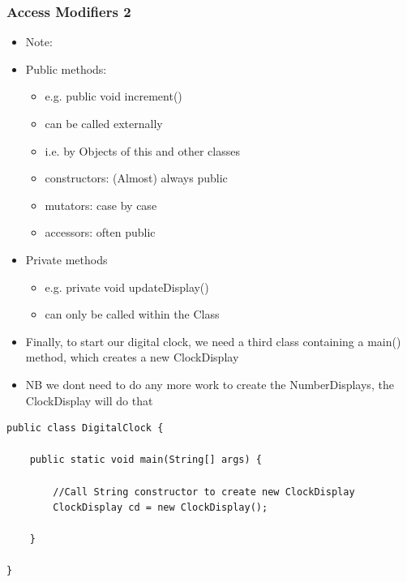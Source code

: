 \documentclass{beamer}
\begin{document}
\begin{frame}
\frametitle{Access Modifiers 2}
\begin{itemize}
\item Note: 

\item Public methods:

\begin{itemize}
\item e.g. public void increment() 
\item can be called externally
\item i.e. by Objects of this and other classes
\bigskip
\item constructors: (Almost) always public
\item mutators: case by case
\item accessors: often public
\end{itemize}
\item Private methods

\begin{itemize}
\item e.g. private void updateDisplay()
\item can only be called within the Class
\end{itemize}
\end{itemize}
\end{frame}

\begin{frame}[fragile]
\begin{itemize}
\item Finally, to start our digital clock, we need a third class containing a main() method, which creates a new ClockDisplay
\item NB we dont need to do any more work to create the NumberDisplays, the ClockDisplay will do that
\end{itemize}
\begin{block}{}
\begin{lstlisting}
public class DigitalClock {

    public static void main(String[] args) {
    	
    	//Call String constructor to create new ClockDisplay
    	ClockDisplay cd = new ClockDisplay();
    	
    }

}
\end{lstlisting}
\end{block}
\end{frame}
\end{document}
